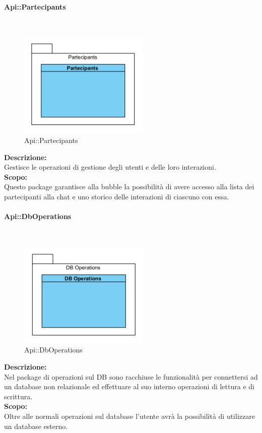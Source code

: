 \begin{samepage}
\paragraph{Api\-::Partecipants}\label{api-partecipanti}\mbox{}\\
\nopagebreak
\begin{figure}[H]
	\centering
	\includegraphics[height=5cm]{diagrammi_img/classi_e_package/api_partecipanti.png}
	\caption{Api\-::Partecipants}
\end{figure}
\end{samepage}
\textbf{Descrizione:}\\ 
Gestisce le operazioni di gestione degli utenti e delle loro interazioni.\\
\textbf{Scopo:}\\
Questo package garantisce alla bubble la possibilità di avere accesso alla lista dei partecipanti alla chat e uno storico delle interazioni di ciascuno con essa.

\begin{samepage}
\paragraph{Api\-::DbOperations}\label{api-db}\mbox{}\\
\nopagebreak
\begin{figure}[H]
	\centering
	\includegraphics[height=5cm]{diagrammi_img/classi_e_package/api_operazionidb.png}
	\caption{Api\-::DbOperations}
\end{figure}
\end{samepage}
\textbf{Descrizione:}\\
Nel package di operazioni sul DB sono racchiuse le funzionalità per connettersi ad un database non relazionale ed effettuare al suo interno operazioni di lettura e di scrittura.\\
\textbf{Scopo:}\\
Oltre alle normali operazioni sul database l'utente avrà la possibilità di utilizzare un database esterno.

